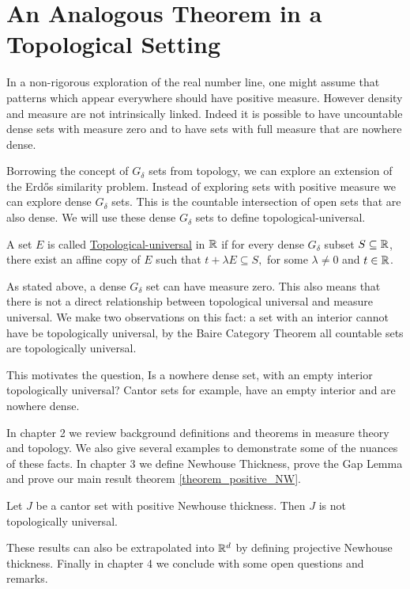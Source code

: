 \section{An Analogous Theorem in a Topological Setting}

In a non-rigorous exploration of the real number line, one might assume that patterns which appear everywhere should have positive measure.  However density and measure are not intrinsically linked.  Indeed it is possible to have uncountable dense sets with measure zero and to have sets with full measure that are nowhere dense.  

Borrowing the concept of $G_\delta$ sets from topology, we can explore an extension of the Erd\H{o}s similarity problem.  Instead of exploring sets with positive measure we can explore dense $G_\delta$ sets.  This is the countable intersection of open sets that are also dense.  We will use these dense $G_\delta$ sets to define topological-universal. 

\begin{definition}
    A set $E$ is called \underline{Topological-universal} in $\mathbb{R}$ if for every dense $G_\delta$ subset $S \subseteq \mathbb{R}$, there exist an affine copy of $E$ such that $t+\lambda E \subseteq S,$ for some $\lambda \neq 0$ and $t \in \mathbb{R}$.  
\end{definition}

As stated above, a dense $G_\delta$ set can have measure zero.  This also means that there is not a direct relationship between topological universal and measure universal.  We make two observations on this fact: a set with an interior cannot have be topologically universal, by the Baire Category Theorem all countable sets are topologically universal.   

This motivates the question, Is a nowhere dense set, with an empty interior topologically universal?  Cantor sets for example, have an empty interior and are nowhere dense.  

In chapter 2 we review background definitions and theorems in measure theory and topology.  We also give several examples to demonstrate some of the nuances of these facts.  In chapter 3 we define Newhouse Thickness, prove the Gap Lemma and prove our main result theorem \ref{theorem_positive_NW}.

\begin{theorem*}
Let $J$ be a cantor set with positive Newhouse thickness.  Then $J$ is not topologically universal.
\end{theorem*}

These results can also be extrapolated into $\mathbb{R}^d$ by defining projective Newhouse thickness.  Finally in chapter 4 we conclude with some open questions and remarks.  



